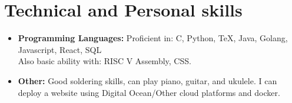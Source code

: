 \documentclass[11pt,letterpaper,sans]{moderncv}        %
\begin{document}
\section{Technical and Personal skills}

\vspace{6pt}

\begin{itemize}

\item \textbf{Programming Languages:} Proficient in: C, Python, TeX, Java, Golang, Javascript, React, SQL \\ Also basic ability with: RISC V Assembly, CSS.

\vspace{6pt}

\item \textbf{Other:} Good soldering skills, can play piano, guitar, and ukulele. I can deploy a website using Digital Ocean/Other cloud platforms and docker.

\end{itemize}


\nocite{*}



\end{document}
